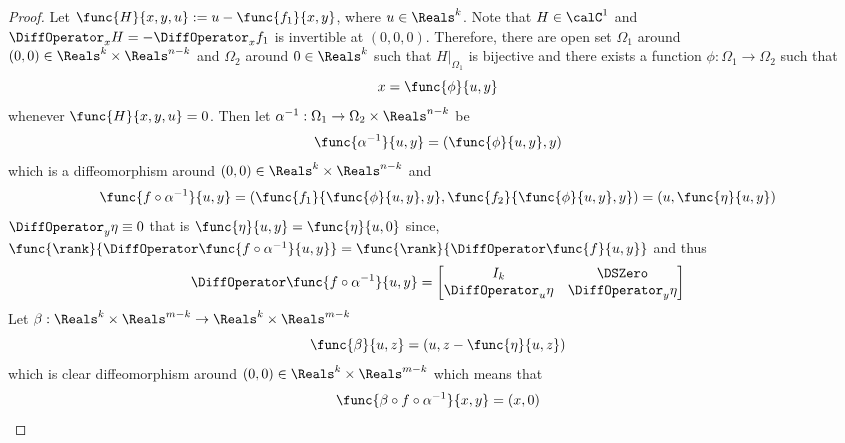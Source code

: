 \begin{proof}
    Let \(\func{H}{x,y,u} := u - \func{f_1}{x,y}\), where \(u \in \Reals^k\). Note that \(H \in \calC^1\) and \(\DiffOperator_x H = -\DiffOperator_x f_1\) is invertible at \((0,0,0)\). Therefore, there are open set \(\Omega_1\) around \((0,0) \in \Reals^{k} \times \Reals^{n-k}\) and \(\Omega_2\) around \(0 \in \Reals^k\) such that \(H|_{\Omega_1}\) is bijective and there exists a function \(\phi: \Omega_1 \to \Omega_2\) such that
    \begin{equation*}
        x = \func{\phi}{u,y}
    \end{equation*}
    whenever \(\func{H}{x,y,u} = 0\). Then let \(\alpha^{-1} : \Omega_1 \to \Omega_2 \times \Reals^{n-k}\) be
    \begin{equation*}
        \func{\alpha^{-1}}{u,y} = (\func{\phi}{u,y},y)
    \end{equation*}
    which is a diffeomorphism around \((0,0) \in \Reals^{k} \times \Reals^{n-k}\) and
    \begin{equation*}
        \func{f \circ \alpha^{-1}}{u,y} = (\func{f_1}{\func{\phi}{u,y},y}, \func{f_2}{\func{\phi}{u,y},y}) = (u, \func{\eta}{u,y})
    \end{equation*}
    \(\DiffOperator_y \eta \equiv 0\) that is \(\func{\eta}{u,y} = \func{\eta}{u,0}\) since, \(\func{\rank}{\DiffOperator \func{f \circ \alpha^{-1}}{u,y}} = \func{\rank}{\DiffOperator \func{f}{u,y}}\) and thus
    \begin{equation*}
        \DiffOperator \func{f \circ \alpha^{-1}}{u,y} = \begin{bmatrix}
            I_k                  & \DSZero              \\
            \DiffOperator_u \eta & \DiffOperator_y \eta
        \end{bmatrix}
    \end{equation*}
    Let \(\beta : \Reals^k \times \Reals^{m-k} \to \Reals^k \times \Reals^{m-k}\)
    \begin{equation*}
        \func{\beta}{u,z} = (u,z - \func{\eta}{u,z})
    \end{equation*}
    which is clear diffeomorphism around \((0,0) \in \Reals^k \times \Reals^{m-k}\) which means that
    \begin{equation*}
        \func{ \beta \circ f \circ \alpha^{-1} }{x,y} = (x,0)
    \end{equation*}
\end{proof}


